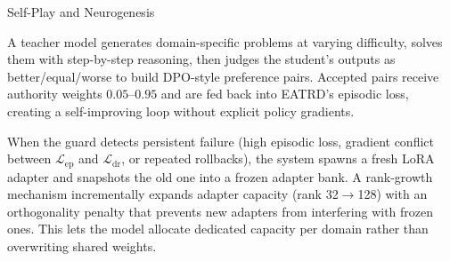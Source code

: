   \begin{block}{Self-Play and Neurogenesis}


    A teacher model generates domain-specific problems at varying difficulty, solves them with step-by-step reasoning, then judges the student's outputs as better/equal/worse to build DPO-style preference pairs. Accepted pairs receive authority weights $0.05$--$0.95$ and are fed back into EATRD's episodic loss, creating a self-improving loop without explicit policy gradients.


    When the guard detects persistent failure (high episodic loss, gradient conflict between $\mathcal{L}_{\mathrm{ep}}$ and $\mathcal{L}_{\mathrm{dr}}$, or repeated rollbacks), the system spawns a fresh LoRA adapter and snapshots the old one into a frozen adapter bank. A rank-growth mechanism incrementally expands adapter capacity (rank 32$\to$128) with an orthogonality penalty that prevents new adapters from interfering with frozen ones. This lets the model allocate dedicated capacity per domain rather than overwriting shared weights.

  \end{block}
